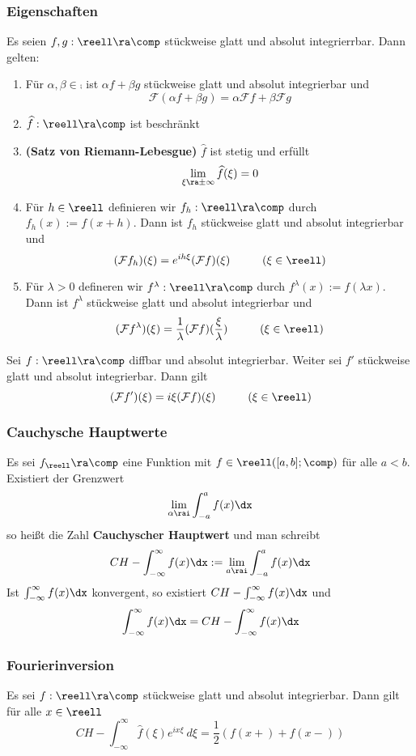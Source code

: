 \documentclass{kit}
\begin{document}
    \subsubsection{Eigenschaften}
      Es seien $f,g:\reell\ra\comp$ stückweise glatt und absolut integrierrbar. Dann gelten:
      \begin{enumerate}
        \item Für $\alpha,\beta\in\comp$ ist $\alpha f+\beta g$ stückweise glatt und absolut integrierbar und
          $$\mathcal{F}(\alpha f+\beta g)=\alpha\mathcal{F}f+\beta\mathcal{F}g$$
        \item $\widehat f:\reell\ra\comp$ ist beschränkt
        \item \textbf{(Satz von Riemann-Lebesgue)} $\widehat f$ ist stetig und erfüllt
          $$\lim_{\xi\ra\pm\infty}\widehat f(\xi)=0$$
        \item Für $h\in\reell$ definieren wir $f_h:\reell\ra\comp$ durch $f_h(x):=f(x+h)$. Dann ist $f_h$ stückweise glatt
          und absolut integrierbar und
          $$(\mathcal{F}f_h)(\xi)=e^{ih\xi}(\mathcal{F}f)(\xi)\hspace{1cm}(\xi\in\reell)$$
        \item Für $\lambda>0$ defineren wir $f^\lambda:\reell\ra\comp$ durch $f^\lambda(x):=f(\lambda x)$. Dann ist 
          $f^\lambda$ stückweise glatt und absolut integrierbar und
          $$(\mathcal{F}f^\lambda)(\xi)=\frac{1}{\lambda}(\mathcal{F}f)(\frac{\xi}{\lambda})\hspace{1cm}(\xi\in\reell)$$
      \end{enumerate}
      Sei $f:\reell\ra\comp$ diffbar und absolut integrierbar. Weiter sei $f'$ stückweise glatt und absolut integrierbar. 
      Dann gilt
      $$(\mathcal{F}f')(\xi)=i\xi(\mathcal{F}f)(\xi)\hspace{1cm}(\xi\in\reell)$$
    \subsubsection{Cauchysche Hauptwerte}
      Es sei $f_\reell\ra\comp$ eine Funktion mit $f\in\reell([a,b];\comp)$ für alle $a<b$. Existiert der Grenzwert
      $$\lim_{\alpha\rai}\int^a_{-a}f(x)\dx$$
      so heißt die Zahl \textbf{Cauchyscher Hauptwert} und man schreibt
      $$CH-\int^\infty_{-\infty}f(x)\dx:=\lim_{a\rai}\int^a_{-a}f(x)\dx$$
      Ist $\int^\infty_{-\infty}f(x)\dx$ konvergent, so existiert $CH-\int^\infty_{-\infty}f(x)\dx$ und
      $$\int^\infty_{-\infty}f(x)\dx=CH-\int^\infty_{-\infty}f(x)\dx$$
    \subsubsection{Fourierinversion}
      Es sei $f:\reell\ra\comp$ stückweise glatt und absolut integrierbar. Dann gilt für alle $x\in\reell$
      $$CH-\int^\infty_{-\infty}\widehat f(\xi)e^{ix\xi}\ d\xi=\frac{1}{2}(f(x+)+f(x-))$$
\end{document}
